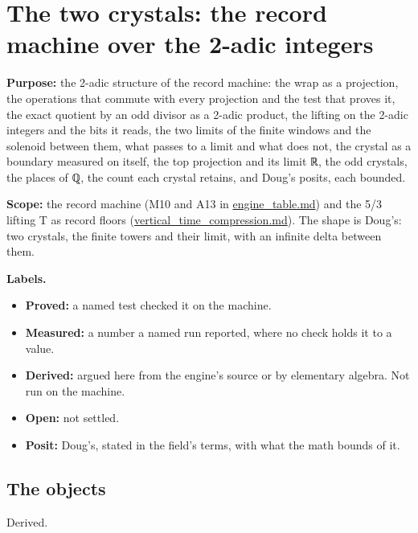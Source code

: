 \chapter{\texorpdfstring{The two crystals: the record machine over the 2-adic integers}{The two crystals: the record machine over the 2-adic integers}}
\label{chap:two-crystals}

\textbf{Purpose:} the 2-adic structure of the record machine: the wrap as a projection, the operations that commute with every projection and the test that proves it, the exact quotient by an odd divisor as a 2-adic product, the lifting on the 2-adic integers and the bits it reads, the two limits of the finite windows and the solenoid between them, what passes to a limit and what does not, the crystal as a boundary measured on itself, the top projection and its limit ℝ, the odd crystals, the places of ℚ, the count each crystal retains, and Doug's posits, each bounded.

\textbf{Scope:} the record machine (M10 and A13 in \hyperref[chap:engine-table]{engine\_\allowbreak{}table.md}) and the 5/3 lifting T as record floors (\hyperref[chap:vertical-time-compression]{vertical\_\allowbreak{}time\_\allowbreak{}compression.md}). The shape is Doug's: two crystals, the finite towers and their limit, with an infinite delta between them.

\textbf{Labels.}

\begin{itemize}
\item \textbf{Proved:} a named test checked it on the machine.
\item \textbf{Measured:} a number a named run reported, where no check holds it to a value.
\item \textbf{Derived:} argued here from the engine's source or by elementary algebra. Not run on the machine.
\item \textbf{Open:} not settled.
\item \textbf{Posit:} Doug's, stated in the field's terms, with what the math bounds of it.
\end{itemize}

\section{\texorpdfstring{The objects}{The objects}}

Derived.

